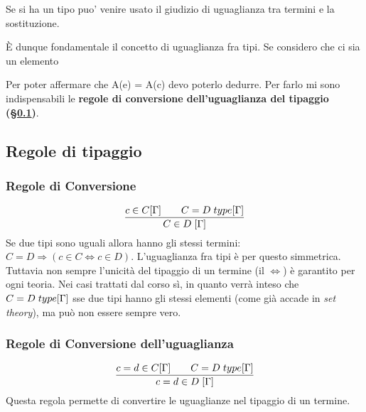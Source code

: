 \begin{prooftree}
\end{prooftree}
Se si ha un tipo puo' venire usato il giudizio di uguaglianza tra termini e la sostituzione.
\begin{prooftree}
\end{prooftree}
\noindent
\`E dunque fondamentale il concetto di uguaglianza fra tipi. Se considero che ci sia un elemento

\begin{prooftree}
\end{prooftree}
\noindent
Per poter affermare che A(e) = A(c) devo poterlo dedurre. Per farlo mi sono indispensabili le \textbf{regole di conversione dell'uguaglianza del tipaggio (\S\ref{subsec:regole-tipaggio})}.

\subsection{Regole di tipaggio}
\label{subsec:regole-tipaggio}

\subsubsection{Regole di Conversione}
\label{subsubsec:regole-di-conversione}
\[\frac{c \in C[\Gamma] \qquad C = D\hspace{0.1cm}type[\Gamma]}{C \in D\hspace{0.1cm}[\Gamma]}\]
Se due tipi sono uguali allora hanno gli stessi termini: $C=D \Rightarrow (c \in C \Leftrightarrow c \in D)$. L'uguaglianza fra tipi \`e per questo simmetrica.\\
Tuttavia non sempre l'unicit\`a del tipaggio di un termine (il $\Leftrightarrow$) \`e garantito per ogni teoria. Nei casi trattati dal corso s\`i, in quanto verr\`a inteso che $C = D\hspace{0.1cm}type[\Gamma]$ sse due tipi hanno gli stessi elementi (come gi\`a accade in \textit{set theory}), ma pu\`o non essere sempre vero.

\subsubsection{Regole di Conversione dell'uguaglianza}
\label{subsubsec:regole-di-conversione-uguaglianza}
\[\frac{c=d \in C[\Gamma] \qquad C = D\hspace{0.1cm}type[\Gamma]}{c = d \in D \hspace{0.1cm} [\Gamma]}\]
Questa regola permette di convertire le uguaglianze nel tipaggio di un termine.


